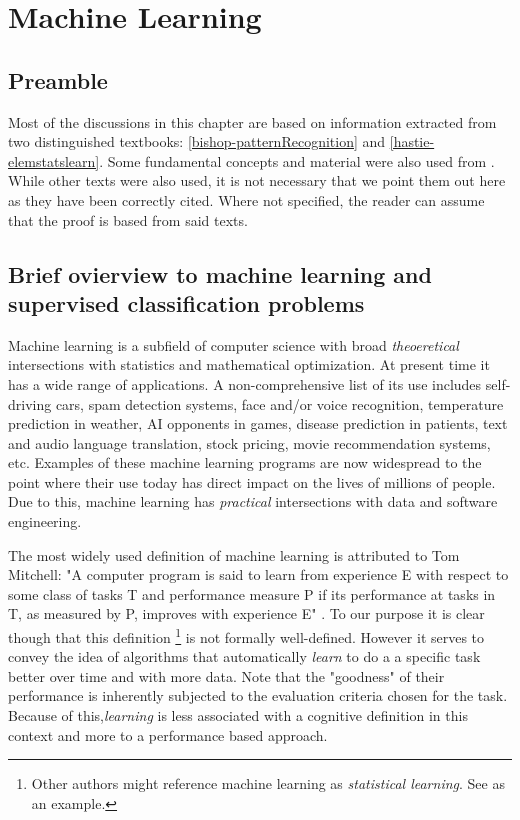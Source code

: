 \chapter{Machine Learning}
\label{cha:machine_learning}


\section{Preamble}\label{section-preamble}
Most of the discussions in this chapter are based on information extracted from two distinguished textbooks: \ref{bishop-patternRecognition} and  \ref{hastie-elemstatslearn}. Some fundamental concepts and material were also used from \label{scikit-learn}. While other texts were also used, it is not necessary that we point them out here as they have been correctly cited. Where not specified, the reader can assume that the proof is based from said texts.


\section{ Brief ovierview to machine learning and supervised classification problems}\label{section-introduction}

Machine learning is a subfield of computer science with broad \textit{theoeretical} intersections with statistics and mathematical optimization. At present time it has a wide range of applications. A non-comprehensive list of its use includes self-driving cars, spam detection systems, face and/or voice recognition, temperature prediction in weather, AI opponents in games, disease prediction in patients, text and audio language translation, stock pricing, movie recommendation systems, etc. Examples of these machine learning programs are now widespread to the point where their use today has direct impact on the lives of millions of people. Due to this, machine learning has \textit{practical} intersections with data and software engineering.

The most widely used definition of machine learning is attributed to Tom Mitchell:
"A computer program is said to learn from experience E with respect to some class of tasks T and performance measure P if its performance at tasks in T, as measured by P, improves with experience E" \textcite{Mitchell-MLearning}. To our purpose it is clear though that this definition \footnote{Other authors might reference machine learning as \textit{statistical learning}. See \textcite{hastie-elemstatslearn} as an example.} is not formally well-defined. However it serves to convey the idea of algorithms that automatically \textit{learn} to do a a specific task better over time and with more data. Note that the "goodness" of their performance is inherently subjected to the evaluation criteria chosen for the task. Because of this,\textit{learning} is less associated with a cognitive definition in this context and more to a performance based approach.

